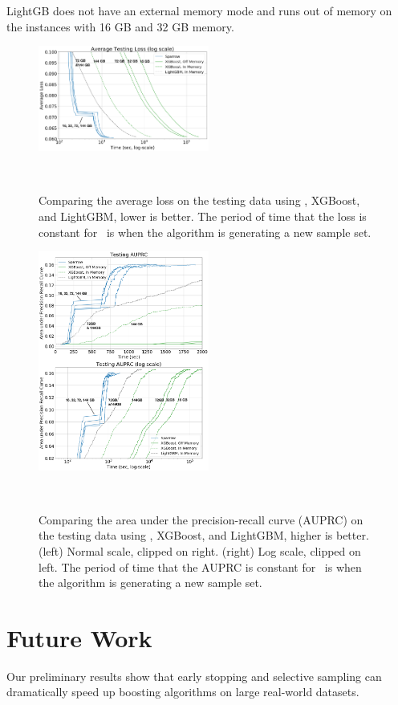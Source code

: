 LightGB does not have an external memory mode and runs out of memory
on the instances with 16 GB and 32 GB memory.



\begin{figure}[t]
    \centering
    \includegraphics[width=0.5\textwidth]{figs/splice-loss2m.png}
    \caption{Comparing the average loss on the testing data using \Sparrow, XGBoost, and LightGBM, lower is better.
        The period of time that the loss is constant for \Sparrow\ is when the algorithm is generating a new sample set.}~\label{fig:loss}
\end{figure}



\begin{figure}[t]
    \centering
    \includegraphics[width=0.5\textwidth]{figs/splice-auprc2m.png}
    \caption{Comparing the area under the precision-recall curve (AUPRC) on the testing data
    using \Sparrow, XGBoost, and LightGBM, higher is better.
    (left) Normal scale, clipped on right.
    (right) Log scale, clipped on left.
    The period of time that the AUPRC is constant for \Sparrow\ is when the algorithm is generating a new sample set.}~\label{fig:auprc}
\end{figure}


\section{Future Work}\label{sec:Conclusion}
Our preliminary results show that early stopping and selective
sampling can dramatically speed up boosting algorithms on large
real-world datasets.

